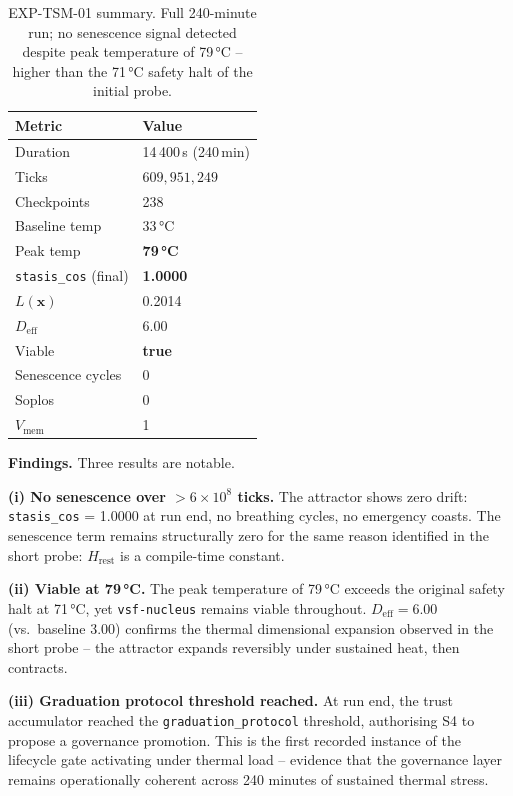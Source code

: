 \documentclass[11pt, a4paper]{article}
\newcommand{\nucleus}{\texttt{vsf-nucleus}}
\begin{document}
\begin{table}[h]
\centering
\begin{tabular}{ll}
\toprule
Metric & Value \\
\midrule
Duration & 14\,400\,s (240\,min) \\
Ticks & $609{,}951{,}249$ \\
Checkpoints & 238 \\
Baseline temp & 33\,°C \\
Peak temp & \textbf{79\,°C} \\
\texttt{stasis\_cos} (final) & \textbf{1.0000} \\
$L(\mathbf{x})$ & 0.2014 \\
$D_\text{eff}$ & 6.00 \\
Viable & \textbf{true} \\
Senescence cycles & 0 \\
Soplos & 0 \\
$V_\text{mem}$ & 1 \\
\bottomrule
\end{tabular}
\caption{EXP-TSM-01 summary. Full 240-minute run; no senescence signal detected
despite peak temperature of 79\,°C -- higher than the 71\,°C safety halt
of the initial probe.}
\label{tab:tsm01}
\end{table}

\textbf{Findings.}
Three results are notable.

\textbf{(i) No senescence over $>6 \times 10^8$ ticks.}
The attractor shows zero drift: \texttt{stasis\_cos} = 1.0000 at run end,
no breathing cycles, no emergency coasts.
The senescence term remains structurally zero for the same reason identified
in the short probe: $H_\text{rest}$ is a compile-time constant.

\textbf{(ii) Viable at 79\,°C.}
The peak temperature of 79\,°C exceeds the original safety halt at 71\,°C,
yet \nucleus{} remains viable throughout.
$D_\text{eff} = 6.00$ (vs.\ baseline 3.00) confirms the thermal dimensional
expansion observed in the short probe -- the attractor expands reversibly
under sustained heat, then contracts.

\textbf{(iii) Graduation protocol threshold reached.}
At run end, the trust accumulator reached the \texttt{graduation\_protocol}
threshold, authorising S4 to propose a governance promotion.
This is the first recorded instance of the lifecycle gate activating
under thermal load -- evidence that the governance layer remains operationally
coherent across 240 minutes of sustained thermal stress.
\end{document}
